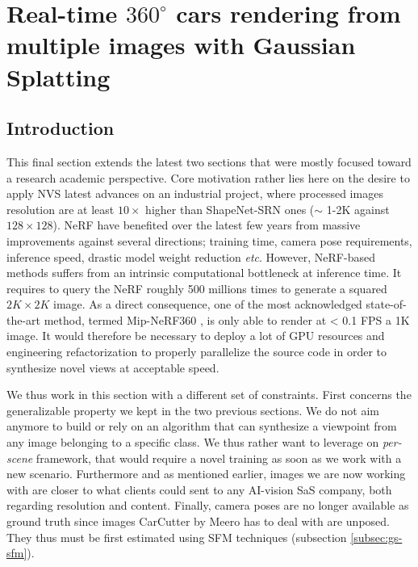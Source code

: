\chapter{Real-time $360 ^{\circ} $ cars rendering from multiple images with Gaussian Splatting}
\label{chapter:gausssplat}


\section{Introduction}
This final section extends the latest two sections that were mostly focused toward a research academic perspective. Core motivation rather lies here on the desire to apply \ac{NVS} latest advances on an industrial project, where processed images resolution are at least $10\times$ higher than ShapeNet-SRN \citep{chang2015shapenet,sitzmann2019scene} ones ($\sim$ 1-2K against $128\times128$). \ac{NeRF} have benefited over the latest few years from massive improvements against several directions; training time, camera pose requirements, inference speed, drastic model weight reduction \textit{etc}. 
However, \ac{NeRF}-based methods suffers from an intrinsic computational bottleneck at inference time. It requires to query the \ac{NeRF} roughly 500 millions times to generate a squared $2K\times2K$ image. As a direct consequence, one of the most acknowledged state-of-the-art method, termed Mip-NeRF360 \citep{barron2022mip}, is only able to render at < 0.1 \ac{FPS} a 1K image. It would therefore be necessary to deploy a lot of \ac{GPU} resources and engineering refactorization to properly parallelize the source code in order to synthesize novel views at acceptable speed. 

We thus work in this section with a different set of constraints. First concerns the generalizable property we kept in the two previous sections. We do not aim anymore to build or rely on an algorithm that can synthesize a viewpoint from any image belonging to a specific class. We thus rather want to leverage on \textit{per-scene} framework, that would require a novel training as soon as we work with a new scenario. Furthermore and as mentioned earlier, images we are now working with are closer to what clients could sent to any \ac{AI}-vision SaS company, both regarding resolution and content. Finally, camera poses are no longer available as ground truth since images CarCutter by Meero has to deal with are unposed. They thus must be first estimated using \ac{SFM} techniques (subsection \ref{subsec:gs-sfm}).

